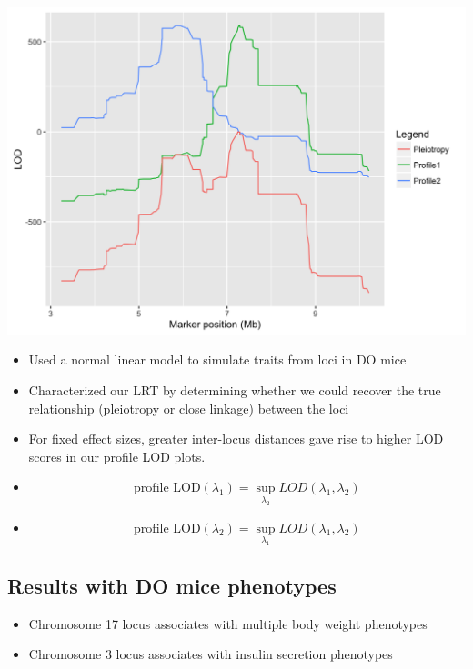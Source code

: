\documentclass[a0,landscape]{a0poster}
\begin{document}
\begin{multicols}{4}
\begin{center}\vspace{1cm}
\includegraphics[width=0.8\linewidth]{sim-50markers}
\end{center}\vspace{1cm}



\begin{itemize}
\item Used a normal linear model to simulate traits from loci in DO mice
\item Characterized our LRT by determining whether we could recover the true relationship (pleiotropy or close linkage) between the loci
\item For fixed effect sizes, greater inter-locus distances gave rise to higher LOD scores in our profile LOD plots.
\item \begin{equation}
\text{profile LOD}(\lambda_1) = \sup_{\lambda_2}LOD(\lambda_1, \lambda_2)
\end{equation}
\item \begin{equation}
\text{profile LOD}(\lambda_2) = \sup_{\lambda_1}LOD(\lambda_1, \lambda_2)
\end{equation}


\end{itemize}


\subsection*{Results with DO mice phenotypes}

\begin{itemize}
\item Chromosome 17 locus associates with multiple body weight phenotypes
\item Chromosome 3 locus associates with insulin secretion phenotypes
\end{itemize}



\end{multicols}
\end{document}
